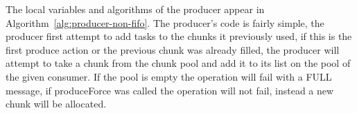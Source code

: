 



The local variables and algorithms of the producer appear in
Algorithm~\ref{alg:producer-non-fifo}. The producer's code is fairly simple, the producer first
attempt to add tasks to the chunks it previously used, if this is the first produce action or the
previous chunk was already filled, the producer will attempt to take a chunk from the chunk pool and
add it to its list on the pool of the given consumer. If the pool is empty the operation will fail
with a FULL message, if produceForce was called the operation will not fail, instead a new chunk
will be allocated. 

